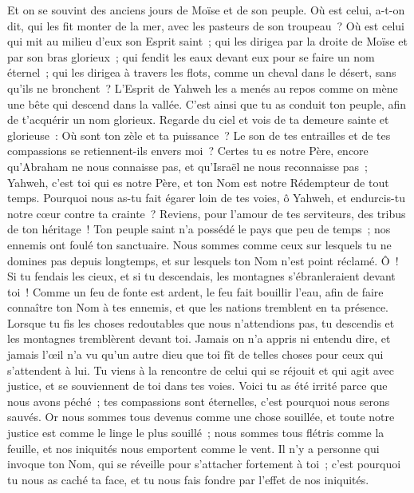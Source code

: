 \begin{multicols}{2}
Et on se souvint des anciens jours de Moïse et de son peuple. Où est celui, a-t-on dit, qui les fit monter de la mer, avec les pasteurs de son troupeau~? Où est celui qui mit au milieu d'eux son Esprit saint~;
qui les dirigea par la droite de Moïse et par son bras glorieux~; qui fendit les eaux devant eux pour se faire un nom éternel~;
qui les dirigea à travers les flots, comme un cheval dans le désert, sans qu'ils ne bronchent~?
L'Esprit de Yahweh les a menés au repos comme on mène une bête qui descend dans la vallée. C'est ainsi que tu as conduit ton peuple, afin de t'acquérir un nom glorieux.
Regarde du ciel et vois de ta demeure sainte et glorieuse~: Où sont ton zèle et ta puissance~? Le son de tes entrailles et de tes compassions se retiennent-ils envers moi~?
Certes tu es notre Père, encore qu'Abraham ne nous connaisse pas, et qu'Israël ne nous reconnaisse pas~; Yahweh, c'est toi qui es notre Père, et ton Nom est notre Rédempteur de tout temps.
Pourquoi nous as-tu fait égarer loin de tes voies, ô Yahweh, et endurcis-tu notre cœur contre ta crainte~? Reviens, pour l'amour de tes serviteurs, des tribus de ton héritage~!
Ton peuple saint n'a possédé le pays que peu de temps~; nos ennemis ont foulé ton sanctuaire.
Nous sommes comme ceux sur lesquels tu ne domines pas depuis longtemps, et sur lesquels ton Nom n'est point réclamé. Ô~! Si tu fendais les cieux, et si tu descendais, les montagnes s'ébranleraient devant toi~!
\VerseOne{}Comme un feu de fonte est ardent, le feu fait bouillir l'eau, afin de faire connaître ton Nom à tes ennemis, et que les nations tremblent en ta présence.
Lorsque tu fis les choses redoutables que nous n'attendions pas, tu descendis et les montagnes tremblèrent devant toi.
Jamais on n'a appris ni entendu dire, et jamais l'œil n'a vu qu'un autre dieu que toi fît de telles choses pour ceux qui s'attendent à lui.
Tu viens à la rencontre de celui qui se réjouit et qui agit avec justice, et se souviennent de toi dans tes voies. Voici tu as été irrité parce que nous avons péché~; tes compassions sont éternelles, c'est pourquoi nous serons sauvés.
Or nous sommes tous devenus comme une chose souillée, et toute notre justice est comme le linge le plus souillé~; nous sommes tous flétris comme la feuille, et nos iniquités nous emportent comme le vent.
Il n'y a personne qui invoque ton Nom, qui se réveille pour s'attacher fortement à toi~; c'est pourquoi tu nous as caché ta face, et tu nous fais fondre par l'effet de nos iniquités.

\end{multicols}
